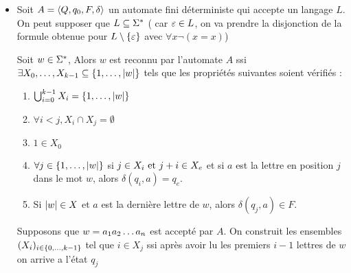 \begin{proofI}
	\begin{itemize}
		\item \fbox{$\Leftarrow$}

		      Soit $A = \langle Q, q_0, F, \delta \rangle$ un automate fini déterministe qui accepte un langage $L$.  On peut supposer que $L \subseteq \Sigma^{*}$ (
		      car $\varepsilon \in L$, on va prendre la disjonction de la formule obtenue pour $L \setminus \left\{\varepsilon\right\}$ avec $\forall x \neg (x = x)$)

		      Soit $w \in \Sigma^{*}$, Alors $w$ est reconnu par l'automate $A$ ssi $\exists X_0,\ldots,X_{k-1} \subseteq \left\{1, \ldots , \left|w\right|\right\}$
		      tels que les propriétés suivantes soient vérifiés :
		      \begin{enumerate}
			      \item $\bigcup_{i=0}^{k - 1} X_i = \left\{1, \ldots, \left|w\right|\right\}$
			      \item $\forall i < j, X_i \cap X_j = \emptyset$
			      \item $1 \in X_0$
			      \item $\forall j \in \left\{1, \ldots, \left|w\right|\right\}$ si $j \in X_i \text{ et } j+i \in X_e$ et si $a$ est la lettre en position $j$ dans le mot
			            $w$, alors $\delta (q_i,a) = q_e$.

			      \item Si $\left|w\right| \in X$ et $a$ est la dernière lettre de $w$, alors $\delta (q_j,a) \in F$.
		      \end{enumerate}

		      Supposons que $w = a_1 a_2 \ldots a_{n}$ est accepté par $A$. On construit les ensembles $(X_i)_{i \in \left\{0,\ldots,k-1\right\}}$
		      tel que $i \in X_j$ ssi après avoir lu les premiers $i-1$ lettres de $w$ on arrive a l'état $q_j$


\end{itemize}
\end{proofI}
